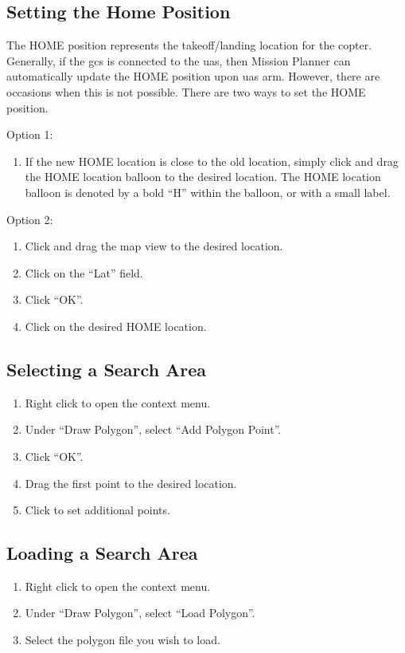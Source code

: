 \documentclass{report}
\begin{document}
		\subsection{Setting the Home Position}
			The HOME position represents the takeoff/landing location for the copter.  Generally, if the \gls{gcs} is connected to the \gls{uas}, then Mission Planner can automatically update the HOME position upon \gls{uas} arm.  However, there are occasions when this is not possible.  There are two ways to set the HOME position.

			Option 1:
			\begin{enumerate}
				\item If the new HOME location is close to the old location, simply click and drag the HOME location balloon to the desired location.  The HOME location balloon is denoted by a bold ``H'' within the balloon, or with a small label.
			\end{enumerate}

			Option 2:
			\begin{enumerate}
				\item Click and drag the map view to the desired location.
				\item Click on the ``Lat'' field.
				\item Click ``OK''.
				\item Click on the desired HOME location.
			\end{enumerate}
		\subsection{Selecting a Search Area}
			\begin{enumerate}
				\item Right click to open the context menu.
				\item Under ``Draw Polygon'', select ``Add Polygon Point''.
				\item Click ``OK''.
				\item Drag the first point to the desired location.
				\item Click to set additional points.
			\end{enumerate}
		\subsection{Loading a Search Area}
			\begin{enumerate}
				\item Right click to open the context menu.
				\item Under ``Draw Polygon'', select ``Load Polygon''.
				\item Select the polygon file you wish to load.
			\end{enumerate}
\end{document}

